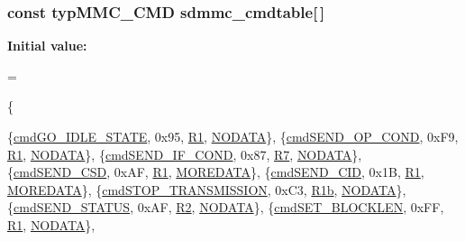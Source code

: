 \subsubsection[{sdmmc\+\_\+cmdtable}]{\setlength{\rightskip}{0pt plus 5cm}const {\bf typ\+M\+M\+C\+\_\+\+C\+M\+D} sdmmc\+\_\+cmdtable\mbox{[}$\,$\mbox{]}}\label{_s_d-_s_p_i_8c_ab6715f92255ff9a1b45df34c10c4803a}
{\bfseries Initial value\+:}
\begin{DoxyCode}
=

\{
    
    \{\hyperlink{_s_d-_s_p_i_8h_a02703e9cab5d95013737adbdbe93c0b0}{cmdGO\_IDLE\_STATE},          0x95,   \hyperlink{_s_d-_s_p_i_8h_a69658e0ba42c5888b733c1ef68ae5187af8d87ff07efe24755164f550526f4dac}{R1},     \hyperlink{_s_d-_s_p_i_8h_a6a2e6b3670a920656095b739efe77613}{NODATA}\},
    \{\hyperlink{_s_d-_s_p_i_8h_a51321e259b663dc7ea15c4c43b9c54df}{cmdSEND\_OP\_COND},           0xF9,   \hyperlink{_s_d-_s_p_i_8h_a69658e0ba42c5888b733c1ef68ae5187af8d87ff07efe24755164f550526f4dac}{R1},     \hyperlink{_s_d-_s_p_i_8h_a6a2e6b3670a920656095b739efe77613}{NODATA}\},
    \{\hyperlink{_s_d-_s_p_i_8h_a6b12e0aa6067fd1100de3375a72918a6}{cmdSEND\_IF\_COND},            0x87,   \hyperlink{_s_d-_s_p_i_8h_a69658e0ba42c5888b733c1ef68ae5187a054fa446dec19779f7d15d8cc5fca5cf}{R7},     \hyperlink{_s_d-_s_p_i_8h_a6a2e6b3670a920656095b739efe77613}{NODATA}\},
    \{\hyperlink{_s_d-_s_p_i_8h_a6909d22ca448c3785d1c65b31d93f205}{cmdSEND\_CSD},               0xAF,   \hyperlink{_s_d-_s_p_i_8h_a69658e0ba42c5888b733c1ef68ae5187af8d87ff07efe24755164f550526f4dac}{R1},     \hyperlink{_s_d-_s_p_i_8h_a60c157f738d808af36cc86bd1fc4361d}{MOREDATA}\},
    \{\hyperlink{_s_d-_s_p_i_8h_ad780cd6b5490b6d4a1252a8412910bc3}{cmdSEND\_CID},               0x1B,   \hyperlink{_s_d-_s_p_i_8h_a69658e0ba42c5888b733c1ef68ae5187af8d87ff07efe24755164f550526f4dac}{R1},     \hyperlink{_s_d-_s_p_i_8h_a60c157f738d808af36cc86bd1fc4361d}{MOREDATA}\},
    \{\hyperlink{_s_d-_s_p_i_8h_a92488a89aa80daa3fa01cc0295956170}{cmdSTOP\_TRANSMISSION},      0xC3,   \hyperlink{_s_d-_s_p_i_8h_a69658e0ba42c5888b733c1ef68ae5187a84a6472e3715e282b0e48f89ce721f9a}{R1b},    \hyperlink{_s_d-_s_p_i_8h_a6a2e6b3670a920656095b739efe77613}{NODATA}\},
    \{\hyperlink{_s_d-_s_p_i_8h_a523f8e42b1b3dda864c422ed2b1e43a5}{cmdSEND\_STATUS},            0xAF,   \hyperlink{_s_d-_s_p_i_8h_a69658e0ba42c5888b733c1ef68ae5187a629d7b403cea5f826352f3aefb9a6d6a}{R2},     \hyperlink{_s_d-_s_p_i_8h_a6a2e6b3670a920656095b739efe77613}{NODATA}\},
    \{\hyperlink{_s_d-_s_p_i_8h_a82811428d69219f685fe5e0437a7b945}{cmdSET\_BLOCKLEN},           0xFF,   \hyperlink{_s_d-_s_p_i_8h_a69658e0ba42c5888b733c1ef68ae5187af8d87ff07efe24755164f550526f4dac}{R1},     \hyperlink{_s_d-_s_p_i_8h_a6a2e6b3670a920656095b739efe77613}{NODATA}\},

\end{DoxyCode}
